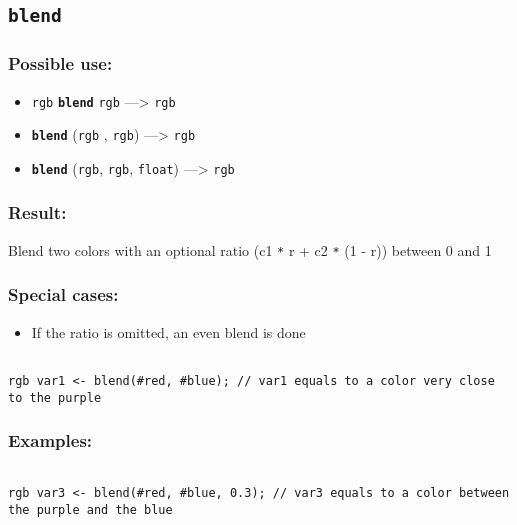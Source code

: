 \documentclass[]{book}
\providecommand{\tightlist}{%
  \setlength{\itemsep}{0pt}\setlength{\parskip}{0pt}}
\theoremstyle{definition}
\theoremstyle{definition}
\theoremstyle{definition}
\theoremstyle{remark}
\begin{document}
\subsection{\texorpdfstring{\texttt{blend}}{blend}}\label{blend}

\subsubsection{Possible use:}\label{possible-use-74}

\begin{itemize}
\tightlist
\item
  \texttt{rgb} \textbf{\texttt{blend}} \texttt{rgb} ---\textgreater{}
  \texttt{rgb}
\item
  \textbf{\texttt{blend}} (\texttt{rgb} , \texttt{rgb})
  ---\textgreater{} \texttt{rgb}
\item
  \textbf{\texttt{blend}} (\texttt{rgb}, \texttt{rgb}, \texttt{float})
  ---\textgreater{} \texttt{rgb}
\end{itemize}

\subsubsection{Result:}\label{result-73}

Blend two colors with an optional ratio (c1 \texttt{*} r + c2 \texttt{*}
(1 - r)) between 0 and 1

\subsubsection{Special cases:}\label{special-cases-25}

\begin{itemize}
\tightlist
\item
  If the ratio is omitted, an even blend is done
\end{itemize}

\begin{verbatim}
 
rgb var1 <- blend(#red, #blue); // var1 equals to a color very close to the purple
\end{verbatim}

\subsubsection{Examples:}\label{examples-57}

\begin{verbatim}
 
rgb var3 <- blend(#red, #blue, 0.3); // var3 equals to a color between the purple and the blue
\end{verbatim}
\end{document}
